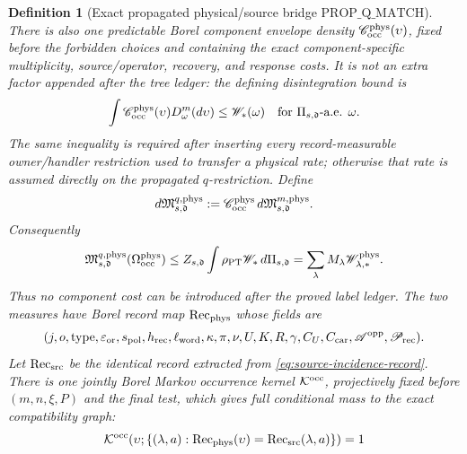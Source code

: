 \documentclass[11pt]{article}
\newtheorem{definition}[theorem]{Definition}
\begin{document}
\begin{definition}[Exact propagated physical/source bridge
$\mathrm{PROP\_Q\_MATCH}$]
There is also one predictable Borel component envelope density
$\mathscr C_{\rm occ}^{\rm phys}(\upsilon)$, fixed before the forbidden
choices and containing the exact component-specific multiplicity,
source/operator, recovery, and response costs.  It is not an extra factor
appended after the tree ledger: the defining disintegration bound is
\begin{equation}
\label{eq:physical-occurrence-envelope-disintegration}
 \int\mathscr C_{\rm occ}^{\rm phys}(\upsilon)
       D_\omega^m(d\upsilon)\le\mathscr W_*(\omega)
 \quad\text{for }\Pi_{s,\mathfrak d}\text{-a.e. }\omega.
\end{equation}
The same inequality is required after inserting every record-measurable
owner/handler restriction used to transfer a physical rate; otherwise that
rate is assumed directly on the propagated $q$-restriction.  Define
\begin{equation}
\label{eq:physical-occurrence-q-measure}
 d\mathfrak M_{s,\mathfrak d}^{q,\rm phys}
 :=\mathscr C_{\rm occ}^{\rm phys}\,
   d\mathfrak M_{s,\mathfrak d}^{m,\rm phys}.
\end{equation}
Consequently
\begin{equation}
\label{eq:physical-occurrence-total-ledger}
 \mathfrak M_{s,\mathfrak d}^{q,\rm phys}
       (\Omega_{\rm occ}^{\rm phys})
 \le Z_{s,\mathfrak d}\int\rho_{\rm PT}\mathscr W_*\,d\Pi_{s,\mathfrak d}
 =\sum_\lambda M_\lambda\mathscr W_{\lambda,*}^{\rm phys}.
\end{equation}
Thus no component cost can be introduced after the proved label ledger.  The two measures have
Borel record map
$\operatorname{Rec}_{\rm phys}$ whose fields are
\begin{equation}
\label{eq:physical-occurrence-record}
 (j,o,\operatorname{type},\varepsilon_{\rm or},s_{\rm pol},h_{\rm rec},
   \ell_{\rm word},\kappa,\pi,\nu,U,K,R,\gamma,C_U,C_{\rm car},
   \mathscr A^{\rm opp},\mathscr P_{\rm rec}).
\end{equation}
Let $\operatorname{Rec}_{\rm src}$ be the identical record extracted from
\eqref{eq:source-incidence-record}.  There is one jointly Borel Markov
occurrence kernel $\mathcal K^{\rm occ}$, projectively fixed before
$(m,n,\xi,P)$ and the final test, which gives full conditional mass to the
exact compatibility graph:
\begin{equation}
\label{eq:prop-q-compatibility-graph}
 \mathcal K^{\rm occ}\!\left(
 \upsilon;
 \{(\lambda,a):
  \operatorname{Rec}_{\rm phys}(\upsilon)
   =\operatorname{Rec}_{\rm src}(\lambda,a)\}\right)=1

\end{equation}
\end{definition}
\end{document}
